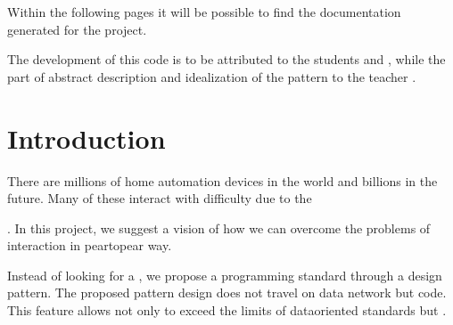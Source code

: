 \documentclass[a4paper,10pt,english,openany,oneside]{sphinxmanual}
\begin{document}
        \clearpage
        \tableofcontents
        \clearpage

        
\pagestyle{plain}
 
\pagestyle{normal}
\label{\detokenize{index::doc}}

\begin{quote}

\begin{footnote}[1]\sphinxAtStartFootnote
{}
%
\end{footnote}
\end{quote}

Within the following pages it will be possible to find the documentation
generated for the  project.

The development of this code is to be attributed to the students  and ,
while the part of abstract description and idealization of the pattern to the teacher .


\chapter{Introduction}
\label{\detokenize{introduction:introduction}}\label{\detokenize{introduction::doc}}
There are millions of home automation devices in the world and billions in the
future. Many of these interact with difficulty due to the  %
\begin{footnote}[1]\sphinxAtStartFootnote
{}
%
\end{footnote}. In this project, we suggest a vision of how we can overcome the problems
of interaction in pear\sphinxhyphen{}to\sphinxhyphen{}pear way.

Instead of looking for a ,
we propose a programming standard through a design pattern. The proposed
pattern design does not travel on data network but code. This feature allows
not only to exceed the limits of data\sphinxhyphen{}oriented standards but .
\end{document}
